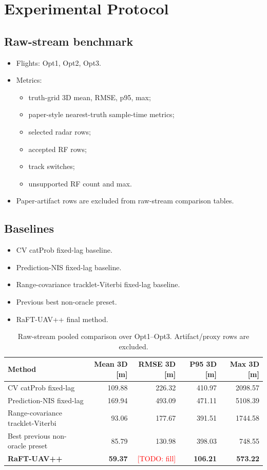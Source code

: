 \documentclass[10pt,conference]{IEEEtran}
\newcommand{\raftpp}{RaFT-UAV++\xspace}
\newcommand{\todo}[1]{\textcolor{red}{[TODO: #1]}}
\begin{document}
\section{Experimental Protocol}
\label{sec:experiments}

\subsection{Raw-stream benchmark}
\begin{itemize}[leftmargin=*]
  \item Flights: Opt1, Opt2, Opt3.
  \item Metrics:\vspace{-0.25em}
  \begin{itemize}[leftmargin=*]
    \item truth-grid 3D mean, RMSE, p95, max;
    \item paper-style nearest-truth sample-time metrics;
    \item selected radar rows;
    \item accepted RF rows;
    \item track switches;
    \item unsupported RF count and max.
  \end{itemize}
  \item Paper-artifact rows are excluded from raw-stream comparison tables.
\end{itemize}

\subsection{Baselines}
\begin{itemize}[leftmargin=*]
  \item CV catProb fixed-lag baseline.
  \item Prediction-NIS fixed-lag baseline.
  \item Range-covariance tracklet-Viterbi fixed-lag baseline.
  \item Previous best non-oracle preset.
  \item \raftpp final method.
\end{itemize}

\begin{table}[t]
\centering
\caption{Raw-stream pooled comparison over Opt1--Opt3. Artifact/proxy rows are excluded.}
\label{tab:raw_pooled}
\begin{tabular}{lrrrr}
\toprule
Method & Mean 3D [m] & RMSE 3D [m] & P95 3D [m] & Max 3D [m] \\
\midrule
CV catProb fixed-lag & 109.88 & 226.32 & 410.97 & 2098.57 \\
Prediction-NIS fixed-lag & 169.94 & 493.09 & 471.11 & 5108.39 \\
Range-covariance tracklet-Viterbi & 93.06 & 177.67 & 391.51 & 1744.58 \\
Best previous non-oracle preset & 85.79 & 130.98 & 398.03 & 748.55 \\
\textbf{\raftpp} & \textbf{59.37} & \todo{fill} & \textbf{106.21} & \textbf{573.22} \\
\bottomrule
\end{tabular}
\end{table}
\end{document}
